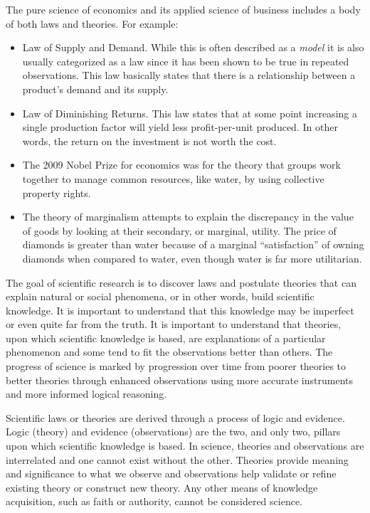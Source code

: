 \documentclass[]{book}
\theoremstyle{definition}
\theoremstyle{definition}
\theoremstyle{definition}
\theoremstyle{remark}
\begin{document}
The pure science of economics and its applied science of business
includes a body of both laws and theories. For example:

\begin{itemize}
\item
  Law of Supply and Demand. While this is often described as a
  \emph{model} it is also usually categorized as a law since it has been
  shown to be true in repeated observations. This law basically states
  that there is a relationship between a product's demand and its
  supply.
\item
  Law of Diminishing Returns. This law states that at some point
  increasing a single production factor will yield less profit-per-unit
  produced. In other words, the return on the investment is not worth
  the cost.
\item
  The 2009 Nobel Prize for economics was for the theory that groups work
  together to manage common resources, like water, by using collective
  property rights.
\item
  The theory of marginalism attempts to explain the discrepancy in the
  value of goods by looking at their secondary, or marginal, utility.
  The price of diamonds is greater than water because of a marginal
  ``satisfaction'' of owning diamonds when compared to water, even
  though water is far more utilitarian.
\end{itemize}

The goal of scientific research is to discover laws and postulate
theories that can explain natural or social phenomena, or in other
words, build scientific knowledge. It is important to understand that
this knowledge may be imperfect or even quite far from the truth. It is
important to understand that theories, upon which scientific knowledge
is based, are explanations of a particular phenomenon and some tend to
fit the observations better than others. The progress of science is
marked by progression over time from poorer theories to better theories
through enhanced observations using more accurate instruments and more
informed logical reasoning.

Scientific laws or theories are derived through a process of logic and
evidence. Logic (theory) and evidence (observations) are the two, and
only two, pillars upon which scientific knowledge is based. In science,
theories and observations are interrelated and one cannot exist without
the other. Theories provide meaning and significance to what we observe
and observations help validate or refine existing theory or construct
new theory. Any other means of knowledge acquisition, such as faith or
authority, cannot be considered science.
\end{document}
